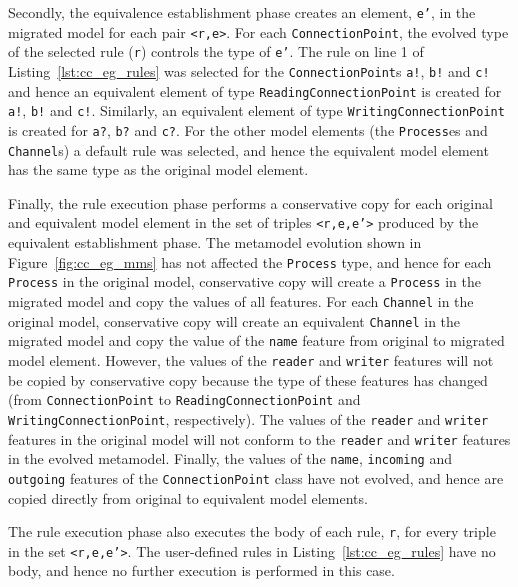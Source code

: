 Secondly, the equivalence establishment phase creates an element, \texttt{e'}, in the migrated model for each pair \texttt{<r,e>}. For each \texttt{ConnectionPoint}, the evolved type of the selected rule (\texttt{r}) controls the type of \texttt{e'}. The rule on line 1 of Listing~\ref{lst:cc_eg_rules} was selected for the \texttt{ConnectionPoint}s \texttt{a!}, \texttt{b!} and \texttt{c!} and hence an equivalent element of type \texttt{ReadingConnectionPoint} is created for \texttt{a!}, \texttt{b!} and \texttt{c!}. Similarly, an equivalent element of type \texttt{WritingConnectionPoint} is created for \texttt{a?}, \texttt{b?} and \texttt{c?}. For the other model elements (the \texttt{Process}es and \texttt{Channel}s) a default rule was selected, and hence the equivalent model element has the same type as the original model element.

Finally, the rule execution phase performs a conservative copy for each original and equivalent model element in the set of triples \texttt{<r,e,e'>} produced by the equivalent establishment phase. The metamodel evolution shown in Figure~\ref{fig:cc_eg_mms} has not affected the \texttt{Pr\-oc\-e\-ss} type, and hence for each \texttt{Pr\-oc\-e\-ss} in the original model, conservative copy will create a \texttt{Pr\-oc\-e\-ss} in the migrated model and copy the values of all features. For each \texttt{Ch\-an\-n\-el} in the original model, conservative copy will create an equivalent \texttt{Ch\-an\-n\-el} in the migrated model and copy the value of the \texttt{na\-me} feature from original to migrated model element. However, the values of the \texttt{re\-ad\-er} and \texttt{wr\-it\-er} features will not be copied by conservative copy because the type of these features has changed (from \texttt{Co\-nn\-ec\-ti\-o\-nP\-oi\-nt} to \texttt{Re\-a\-di\-ngCo\-nn\-ec\-ti\-o\-nP\-oi\-nt} and \texttt{Wr\-i\-ti\-ngCo\-nn\-ec\-ti\-o\-nP\-oi\-nt}, respectively). The values of the \texttt{re\-ad\-er} and \texttt{wr\-it\-er} features in the original model will not conform to the \texttt{re\-ad\-er} and \texttt{wr\-it\-er} features in the evolved metamodel. Finally, the values of the \texttt{na\-me}, \texttt{in\-co\-mi\-ng} and \texttt{ou\-tg\-oi\-ng} features of the \texttt{Co\-nn\-ec\-ti\-o\-nP\-oi\-nt} class have not evolved, and hence are copied directly from original to equivalent model elements.

The rule execution phase also executes the body of each rule, \texttt{r}, for every triple in the set \texttt{<r,e,e'>}. The user-defined rules in Listing~\ref{lst:cc_eg_rules} have no body, and hence no further execution is performed in this case.

